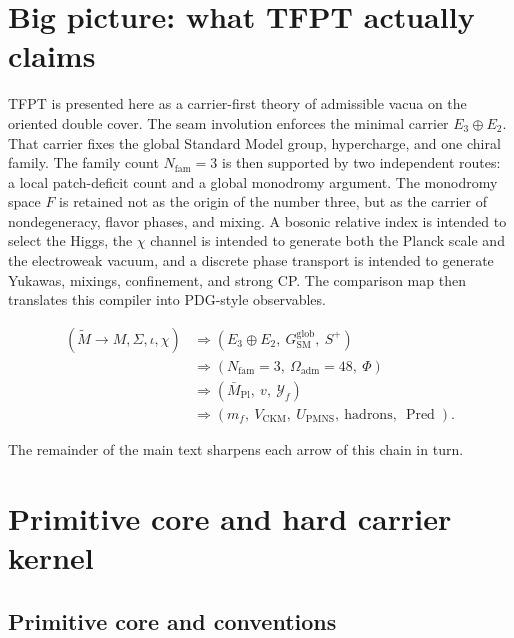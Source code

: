 \documentclass[11pt,a4paper]{article}
\theoremstyle{definition}
\theoremstyle{remark}
\newcommand{\Seam}{\Sigma}
\newcommand{\inv}{\iota}
\newcommand{\Mpl}{\bar M_{\mathrm{Pl}}}
\newcommand{\SM}{\mathrm{SM}}
\newcommand{\Oadm}{\Omega_{\mathrm{adm}}}
\newcommand{\Pred}{\operatorname{Pred}}
\begin{document}
\section{Big picture: what TFPT actually claims}

TFPT is presented here as a carrier-first theory of admissible vacua on the oriented double cover. The seam involution enforces the minimal carrier $E_3\oplus E_2$. That carrier fixes the global Standard Model group, hypercharge, and one chiral family. The family count $N_{\mathrm{fam}}=3$ is then supported by two independent routes: a local patch-deficit count and a global monodromy argument. The monodromy space $F$ is retained not as the origin of the number three, but as the carrier of nondegeneracy, flavor phases, and mixing. A bosonic relative index is intended to select the Higgs, the $\chi$ channel is intended to generate both the Planck scale and the electroweak vacuum, and a discrete phase transport is intended to generate Yukawas, mixings, confinement, and strong CP. The comparison map then translates this compiler into PDG-style observables.

\begin{tcolorbox}[colback=blue!3, colframe=blue!50!black, breakable,
    title={\textbf{Carrier-first compiler chain}}, fonttitle=\bfseries]
\begin{equation}
\label{eq:compiler-chain}
\begin{aligned}
(\widetilde M\to M,\Seam,\inv,\chi)
&\Rightarrow
(E_3\oplus E_2,\ G_{\SM}^{\mathrm{glob}},\ S^+)\\
&\Rightarrow
(N_{\mathrm{fam}}=3,\ \Oadm=48,\ \Phi)\\
&\Rightarrow
(\Mpl,\ v,\ \mathcal Y_f)\\
&\Rightarrow
(m_f,\ V_{\mathrm{CKM}},\ U_{\mathrm{PMNS}},\ \text{hadrons},\ \Pred).
\end{aligned}
\end{equation}
\end{tcolorbox}

The remainder of the main text sharpens each arrow of this chain in turn.

\section{Primitive core and hard carrier kernel}

\subsection{Primitive core and conventions}
\end{document}
